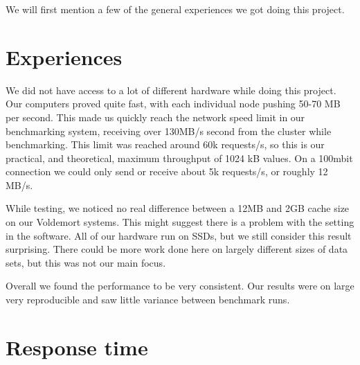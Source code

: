 
We will first mention a few of the general experiences we got doing this project.

\section{Experiences}
We did not have access to a lot of different hardware while doing this project. Our computers proved quite fast, with each individual node pushing 50-70 MB per second. This made us quickly reach the network speed limit in our benchmarking system, receiving over 130MB/s second from the cluster while benchmarking. This limit was reached around 60k requests/s, so this is our practical, and theoretical, maximum throughput of 1024 kB values. On a 100mbit connection we could only send or receive about 5k requests/s, or roughly 12 MB/s. 

While testing, we noticed no real difference between a 12MB and 2GB cache size on our Voldemort systems. This might suggest there is a problem with the setting in the software. All of our hardware run on SSDs, but we still consider this result surprising. There could be more work done here on largely different sizes of data sets, but this was not our main focus.

Overall we found the performance to be very consistent. Our results were on large very reproducible and saw little variance between benchmark runs.

\section{Response time}

